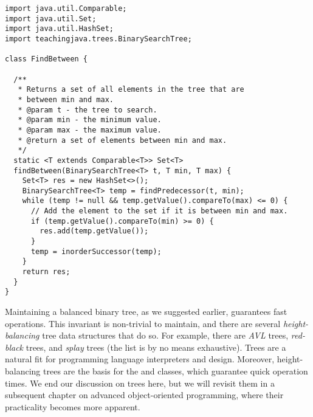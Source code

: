 \begin{lstlisting}[language=MyJava]
import java.util.Comparable;
import java.util.Set;
import java.util.HashSet;
import teachingjava.trees.BinarySearchTree;

class FindBetween {

  /**
   * Returns a set of all elements in the tree that are 
   * between min and max.
   * @param t - the tree to search.
   * @param min - the minimum value.
   * @param max - the maximum value.
   * @return a set of elements between min and max.
   */
  static <T extends Comparable<T>> Set<T> 
  findBetween(BinarySearchTree<T> t, T min, T max) {
    Set<T> res = new HashSet<>();
    BinarySearchTree<T> temp = findPredecessor(t, min);
    while (temp != null && temp.getValue().compareTo(max) <= 0) {
      // Add the element to the set if it is between min and max.
      if (temp.getValue().compareTo(min) >= 0) {
        res.add(temp.getValue());
      }
      temp = inorderSuccessor(temp);
    }
    return res;
  }
}
\end{lstlisting}

Maintaining a balanced binary tree, as we suggested earlier, guarantees fast operations. 
This invariant is non-trivial to maintain, and there are several \emph{height-balancing} tree data structures that do so. 
For example, there are \emph{AVL} trees, \emph{red-black} trees, and \emph{splay} trees (the list is by no means exhaustive). 
Trees are a natural fit for programming language interpreters and design. Moreover, height-balancing trees are the basis for the  and  classes, which guarantee quick operation times.
We end our discussion on trees here, but we will revisit them in a subsequent chapter on advanced object-oriented programming, where their practicality becomes more apparent.